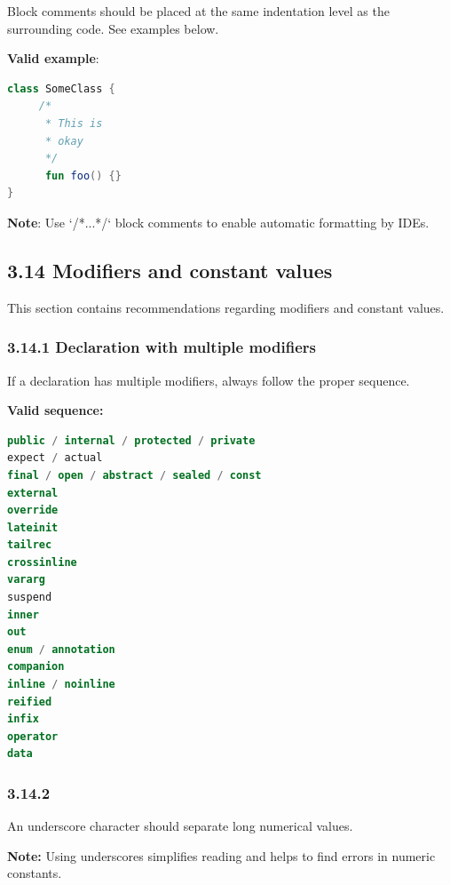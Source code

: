 {{{{Block comments should be placed at the same indentation level as the surrounding code. See examples below.



\textbf{Valid example}:



\begin{lstlisting}[language=Kotlin]
class SomeClass {
     /*
      * This is
      * okay
      */
      fun foo() {}
}
\end{lstlisting}


\textbf{Note}: Use `/*...*/` block comments to enable automatic formatting by IDEs.



\subsection*{\textbf{3.14 Modifiers and constant values}}

This section contains recommendations regarding modifiers and constant values.

\subsubsection*{\textbf{3.14.1 Declaration with multiple modifiers}}
\leavevmode\newline

If a declaration has multiple modifiers, always follow the proper sequence.

\textbf{Valid sequence:}



\begin{lstlisting}[language=Kotlin]
public / internal / protected / private
expect / actual
final / open / abstract / sealed / const
external
override
lateinit
tailrec
crossinline
vararg
suspend
inner
out
enum / annotation
companion
inline / noinline
reified
infix
operator
data
\end{lstlisting}


\subsubsection*{\textbf{3.14.2}}
\leavevmode\newline

An underscore character should separate long numerical values.

\textbf{Note:} Using underscores simplifies reading and helps to find errors in numeric constants.

}}}}
